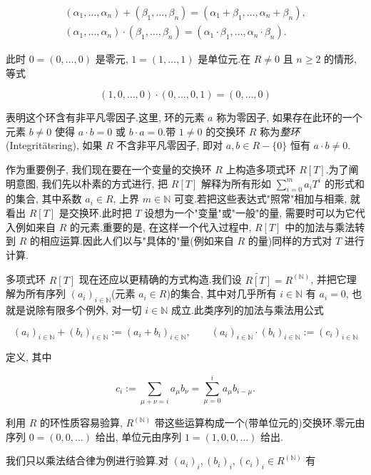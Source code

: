 \[
\begin{array}{l}
(\alpha_1, \ldots, \alpha_n) + (\beta_1, \ldots, \beta_n) = (\alpha_1 + \beta_1, \ldots, \alpha_n + \beta_n), \\
(\alpha_1, \ldots, \alpha_n) \cdot (\beta_1, \ldots, \beta_n) = (\alpha_1 \cdot \beta_1, \ldots, \alpha_n \cdot \beta_n)\text{.}
\end{array}
\]

此时 $0 = (0, \ldots, 0)$ 是零元, $1 = (1, \ldots, 1)$ 是单位元.在 $R \neq 0$ 且 $n \geq 2$ 的情形, 等式

\[
(1, 0, \ldots, 0) \cdot (0, \ldots, 0, 1) = (0, \ldots, 0)
\]

表明这个环含有非平凡零因子.这里, 环的元素 $a$ 称为零因子, 如果存在此环的一个元素 $b \neq 0$ 使得 $a \cdot b = 0$ 或 $b \cdot a = 0$.带 $1 \neq 0$ 的交换环 $R$ 称为\emph{整环}(\textup{Integritätsring}), 如果 $R$ 不含非平凡零因子, 即对 $a, b \in R - \{0\}$ 恒有 $a \cdot b \neq 0$.

作为重要例子, 我们现在要在一个变量的交换环 $R$ 上构造多项式环 $R[T]$.为了阐明意图, 我们先以朴素的方式进行, 把 $R[T]$ 解释为所有形如 $\sum_{i = 0}^{m} a_i T^i$ 的形式和的集合, 其中系数 $a_i \in R$, 上界 $m \in \mathbb{N}$ 可变.若把这些表达式"照常"相加与相乘, 就看出 $R[T]$ 是交换环.此时把 $T$ 设想为一个"变量"或"一般"的量, 需要时可以为它代入例如来自 $R$ 的元素.重要的是, 在这样一个代入过程中, $R[T]$ 中的加法与乘法转到 $R$ 的相应运算.因此人们以与"具体的"量(例如来自 $R$ 的量)同样的方式对 $T$ 进行计算.

多项式环 $R[T]$ 现在还应以更精确的方式构造.我们设 $\widetilde{R[T]} = R^{(\mathbb{N})}$, 并把它理解为所有序列 $(a_i)_{i \in \mathbb{N}}$(元素 $a_i \in R$)的集合, 其中对几乎所有 $i \in \mathbb{N}$ 有 $a_i = 0$, 也就是说除有限多个例外, 对一切 $i \in \mathbb{N}$ 成立.此类序列的加法与乘法用公式

\[
(a_i)_{i \in \mathbb{N}} + (b_i)_{i \in \mathbb{N}} := (a_i + b_i)_{i \in \mathbb{N}}, \qquad
(a_i)_{i \in \mathbb{N}} \cdot (b_i)_{i \in \mathbb{N}} := (c_i)_{i \in \mathbb{N}}
\]

定义, 其中

\[
c_i := \sum_{\mu + \nu = i} a_\mu b_\nu = \sum_{\mu = 0}^{i} a_\mu b_{i - \mu}\text{.}
\]

利用 $R$ 的环性质容易验算, $R^{(\mathbb{N})}$ 带这些运算构成一个(带单位元的)交换环.零元由序列 $0 = (0, 0, \ldots)$ 给出, 单位元由序列 $1 = (1, 0, 0, \ldots)$ 给出.

我们只以乘法结合律为例进行验算.对 $(a_i)_i, (b_i)_i, (c_i)_i \in R^{(\mathbb{N})}$ 有

